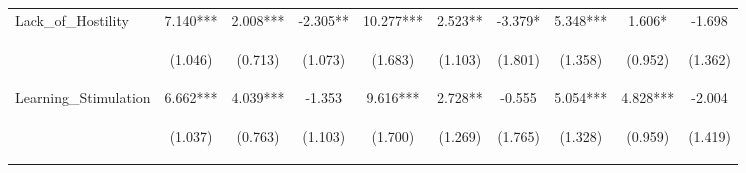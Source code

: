 \begin{tabular}{lccccccccc}
\noalign{\smallskip}Lack_of_Hostility & 7.140*** & 2.008*** & -2.305** & 10.277*** & 2.523** & -3.379* & 5.348*** & 1.606* & -1.698\\
 & \begin{footnotesize}(1.046)\end{footnotesize} & \begin{footnotesize}(0.713)\end{footnotesize} & \begin{footnotesize}(1.073)\end{footnotesize} & \begin{footnotesize}(1.683)\end{footnotesize} & \begin{footnotesize}(1.103)\end{footnotesize} & \begin{footnotesize}(1.801)\end{footnotesize} & \begin{footnotesize}(1.358)\end{footnotesize} & \begin{footnotesize}(0.952)\end{footnotesize} & \begin{footnotesize}(1.362)\end{footnotesize}\\
\noalign{\smallskip}Learning_Stimulation & 6.662*** & 4.039*** & -1.353 & 9.616*** & 2.728** & -0.555 & 5.054*** & 4.828*** & -2.004\\
 & \begin{footnotesize}(1.037)\end{footnotesize} & \begin{footnotesize}(0.763)\end{footnotesize} & \begin{footnotesize}(1.103)\end{footnotesize} & \begin{footnotesize}(1.700)\end{footnotesize} & \begin{footnotesize}(1.269)\end{footnotesize} & \begin{footnotesize}(1.765)\end{footnotesize} & \begin{footnotesize}(1.328)\end{footnotesize} & \begin{footnotesize}(0.959)\end{footnotesize} & \begin{footnotesize}(1.419)\end{footnotesize}\\

\end{tabular}

